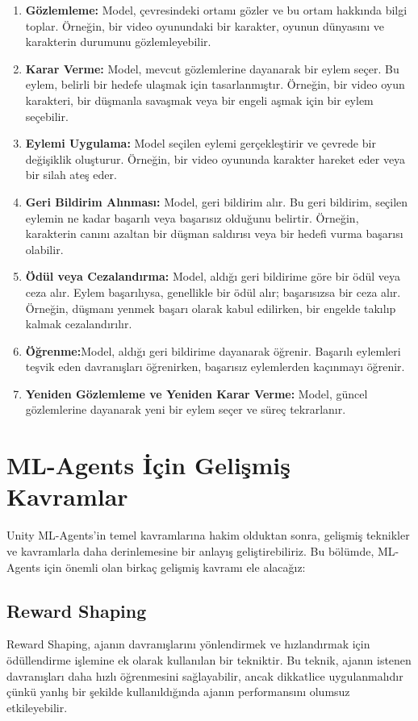 \documentclass{article}
\begin{document}
\begin{enumerate}
    \item \textbf{Gözlemleme:} Model, çevresindeki ortamı gözler ve bu ortam hakkında bilgi toplar. Örneğin, bir video oyunundaki bir karakter, oyunun dünyasını ve karakterin durumunu gözlemleyebilir.
    \item \textbf{Karar Verme:} Model, mevcut gözlemlerine dayanarak bir eylem seçer. Bu eylem, belirli bir hedefe ulaşmak için tasarlanmıştır. Örneğin, bir video oyun karakteri, bir düşmanla savaşmak veya bir engeli aşmak için bir eylem seçebilir.
    \item \textbf{Eylemi Uygulama:} Model seçilen eylemi gerçekleştirir ve çevrede bir değişiklik oluşturur. Örneğin, bir video oyununda karakter hareket eder veya bir silah ateş eder.
    \item \textbf{Geri Bildirim Alınması:} Model, geri bildirim alır. Bu geri bildirim, seçilen eylemin ne kadar başarılı veya başarısız olduğunu belirtir. Örneğin, karakterin canını azaltan bir düşman saldırısı veya bir hedefi vurma başarısı olabilir.
    \item \textbf{Ödül veya Cezalandırma:} Model, aldığı geri bildirime göre bir ödül veya ceza alır. Eylem başarılıysa, genellikle bir ödül alır; başarısızsa bir ceza alır. Örneğin, düşmanı yenmek başarı olarak kabul edilirken, bir engelde takılıp kalmak cezalandırılır.
    \item \textbf{Öğrenme:}Model, aldığı geri bildirime dayanarak öğrenir. Başarılı eylemleri teşvik eden davranışları öğrenirken, başarısız eylemlerden kaçınmayı öğrenir.
    \item \textbf {Yeniden Gözlemleme ve Yeniden Karar Verme:} Model, güncel gözlemlerine dayanarak yeni bir eylem seçer ve süreç tekrarlanır.
\end{enumerate}

    
\section{ML-Agents İçin Gelişmiş Kavramlar}
    Unity ML-Agents'in temel kavramlarına hakim olduktan sonra, gelişmiş teknikler ve kavramlarla daha derinlemesine bir anlayış geliştirebiliriz. Bu bölümde, ML-Agents için önemli olan birkaç gelişmiş kavramı ele alacağız:

    \subsection{Reward Shaping}
        Reward Shaping, ajanın davranışlarını yönlendirmek ve hızlandırmak için ödüllendirme işlemine ek olarak kullanılan bir tekniktir. Bu teknik, ajanın istenen davranışları daha hızlı öğrenmesini sağlayabilir, ancak dikkatlice uygulanmalıdır çünkü yanlış bir şekilde kullanıldığında ajanın performansını olumsuz etkileyebilir.
\end{document}

